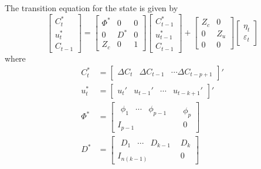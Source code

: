 The transition equation for the state is  given by
\begin{equation}
	\begin{bmatrix}
		C_t^\ast \\ u_t^\ast \\ C_{t-1}
	\end{bmatrix}
	=
	\begin{bmatrix}
		\Phi^\ast & 0 & 0 \\ 0 & D^\ast & 0 \\ Z_c & 0 & 1
	\end{bmatrix}
	\begin{bmatrix}
		C_{t-1}^\ast \\ u_{t-1}^\ast \\ C_{t-1}
	\end{bmatrix}
	+ 
	\begin{bmatrix}
		Z_c & 0 \\ 0 & Z_u \\ 0 & 0
	\end{bmatrix}
	\begin{bmatrix}
		\eta_t \\ \varepsilon_t
	\end{bmatrix}
\end{equation}
where 
\begin{equation}
	\begin{aligned}
		C_{t}^\ast &= 
		\begin{bmatrix}
			\Delta C_t &	\Delta C_{t-1} &\cdots \Delta C_{t-p+1}
		\end{bmatrix}'
		\\
		u_t^\ast &= 
		\begin{bmatrix}
			u_t' & u_{t-1}' & \cdots & u_{t-k+1}'
		\end{bmatrix}'
		\\
		\Phi^\ast &=
		\begin{bmatrix}
			\begin{matrix}
				\phi_1 & \cdots  &\phi_{p-1} &
			\end{matrix} & \phi_p\\
			I_{p-1} & 0 
		\end{bmatrix}
		\\
		D^\ast &=
		\begin{bmatrix}
			\begin{matrix}
				D_1  & \cdots & D_{k-1} 
			\end{matrix}& D_k\\
			I_{n(k-1)} & 0 
		\end{bmatrix}
	\end{aligned}
\end{equation}
